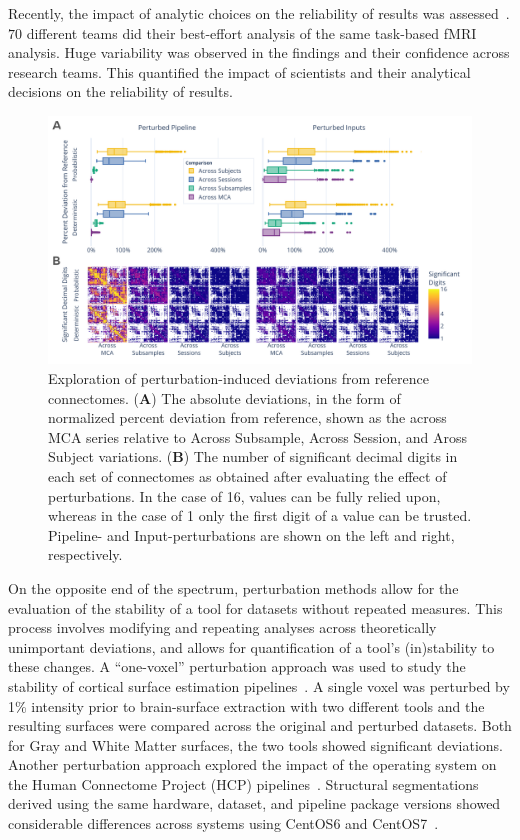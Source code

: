 \documentclass[fleqn,10pt]{SelfArx} %
\begin{document}
Recently, the impact of analytic choices on the reliability of results was assessed~\cite{botvinik2020variability}.
$70$ different teams did their best-effort analysis of the same task-based fMRI analysis. Huge variability was observed
in the findings and their confidence across research teams. This quantified the impact of scientists and their
analytical decisions on the reliability of results. 

\begin{figure}[hbt]\centering
\includegraphics[width=\linewidth]{figures/fig1_absolute_differences.pdf}
\caption{Exploration of perturbation-induced deviations from reference connectomes.
(\textbf{A}) The absolute deviations, in the form of normalized percent deviation from reference, shown as the
across MCA series relative to Across Subsample, Across Session, and Aross Subject variations.
(\textbf{B}) The number of significant decimal digits in each set of connectomes as obtained after evaluating the
effect of perturbations. In the case of 16, values can be fully relied upon, whereas in the case of 1 only the first
digit of a value can be trusted. Pipeline- and Input-perturbations are shown on the left and right, respectively.}
\label{fig:absolute}
\end{figure}

On the opposite end of the spectrum, perturbation methods allow for the evaluation of the stability of a tool for
datasets without repeated measures. This process involves modifying and repeating analyses across theoretically
unimportant deviations, and allows for quantification of a tool's (in)stability to these changes. A ``one-voxel''
perturbation approach was used to study the stability of cortical surface estimation pipelines~\cite{Lewis2017-ll}. A
single voxel was perturbed by 1\% intensity prior to brain-surface extraction  with two different tools and the
resulting surfaces were compared across the original and perturbed datasets. Both for Gray and White Matter surfaces,
the two tools showed significant deviations. Another perturbation approach explored the impact of the operating system
on the Human Connectome Project (HCP) pipelines~\cite{Glasser2013-vf}. Structural segmentations derived using the same
hardware, dataset, and pipeline package versions showed considerable differences across systems using CentOS6 and
CentOS7~\cite{Glatard2015-vc,salari2020file}.
\end{document}

